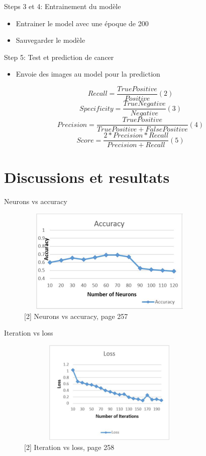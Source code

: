\documentclass{beamer}
\begin{document}
\begin{frame}{Steps 3 et 4: Entrainement du modèle}
\begin{itemize}
		\item  Entrainer le model avec une époque de 200
		\item Sauvegarder le modèle 
\end{itemize}
\end{frame} 

\begin{frame}{Step 5: Test et prediction de cancer}
\begin{itemize}
		\item  Envoie des images au model pour la prediction
\end{itemize}
$$ Recall = \frac{TruePositive}{Positive }  (2)$$
$$ Specificity = \frac{TrueNegative}{Negative} (3)$$
$$ Precision = \frac{TruePositive}{TruePositive + FalsePositive} (4)$$
$$ Score = \frac{2*Precision*Recall}{Precision+Recall} (5)$$
\end{frame} 


\section{Discussions et resultats}
\begin{frame}{Neurons vs accuracy}
\begin{figure}[H]
    \includegraphics[width=9cm,height=5cm]{images/discuss_1.png}
    \caption{[2] Neurons vs accuracy, page 257}
    \label{fig:L1}
\end{figure} 
\end{frame}

\begin{frame}{Iteration vs loss}
\begin{figure}[H]
    \includegraphics[width=9cm,height=5cm]{images/discuss_2.png}
    \caption{[2] Iteration vs loss, page 258}
    \label{fig:L1}
\end{figure} 
\end{frame}
\end{document}

